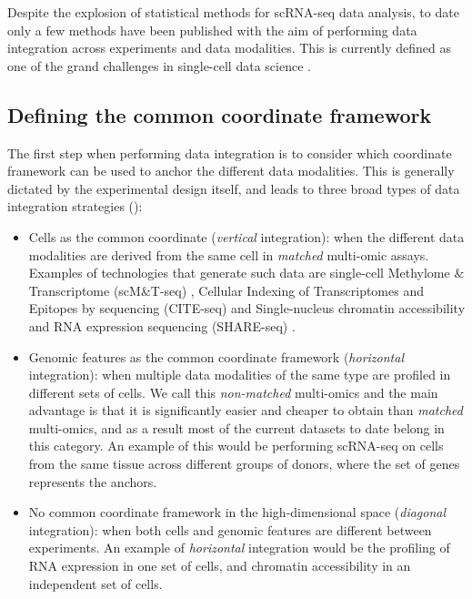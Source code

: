Despite the explosion of statistical methods for scRNA-seq data analysis, to date only a few methods have been published with the aim of performing data integration across experiments and data modalities. This is currently defined as one of the grand challenges in single-cell data science \cite{Lahnemann2020}.

\subsection{Defining the common coordinate framework}

The first step when performing data integration is to consider which coordinate framework can be used to anchor the different data modalities. This is generally dictated by the experimental design itself, and leads to three broad types of data integration strategies (): 

\begin{itemize}

	\item Cells as the common coordinate (\textit{vertical} integration): when the different data modalities are derived from the same cell in \textit{matched} multi-omic assays. Examples of technologies that generate such data are single-cell Methylome \& Transcriptome (scM\&T-seq) \cite{Angermueller2016}, Cellular Indexing of Transcriptomes and Epitopes by sequencing (CITE-seq) \cite{Stoeckius2017} and Single-nucleus chromatin accessibility and RNA expression sequencing (SHARE-seq) \cite{Ma2020}.

	\item Genomic features as the common coordinate framework (\textit{horizontal} integration): when multiple data modalities of the same type are profiled in different sets of cells. We call this \textit{non-matched} multi-omics and the main advantage is that it is significantly easier and cheaper to obtain than \textit{matched} multi-omics, and as a result most of the current datasets to date belong in this category. An example of this would be performing scRNA-seq on cells from the same tissue across different groups of donors, where the set of genes represents the anchors.

	\item No common coordinate framework in the high-dimensional space (\textit{diagonal} integration): when both cells and genomic features are different between experiments. An example of \textit{horizontal} integration would be the profiling of RNA expression in one set of cells, and chromatin accessibility in an independent set of cells.

\end{itemize}

